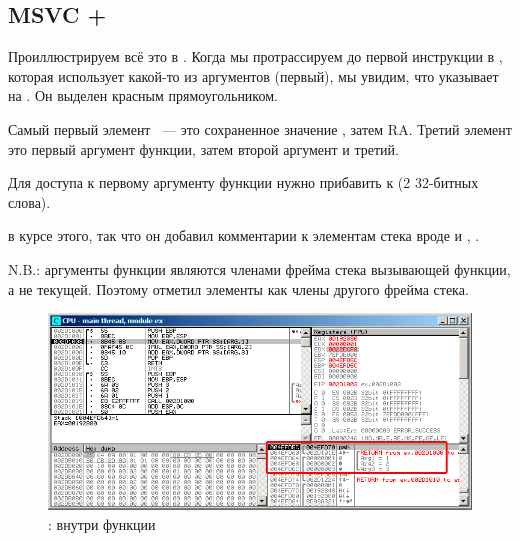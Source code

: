 \subsection{MSVC + \olly}
\myindex{\olly}
Проиллюстрируем всё это в \olly.
Когда мы протрассируем до первой инструкции в \ttf, которая использует какой-то из аргументов
(первый), мы увидим, что \EBP указывает на . Он выделен красным прямоугольником.

Самый первый элемент ~--- это сохраненное значение \EBP, 
затем \ac{RA}. Третий элемент это первый аргумент функции, затем второй аргумент и третий.

Для доступа к первому аргументу функции нужно прибавить к  (2 32-битных слова).

\olly в курсе этого, так что он добавил комментарии к элементам стека вроде
 и , \etc{}.

N.B.: аргументы функции являются членами фрейма стека вызывающей функции, а не текущей.
Поэтому \olly отметил элементы  как члены другого фрейма стека.

\begin{figure}[H]
\centering
\includegraphics[scale=\FigScale]{patterns/05_passing_arguments/olly.png}
\caption{\olly: внутри функции \ttf{}}
\label{fig:passing_arguments_olly}
\end{figure}
